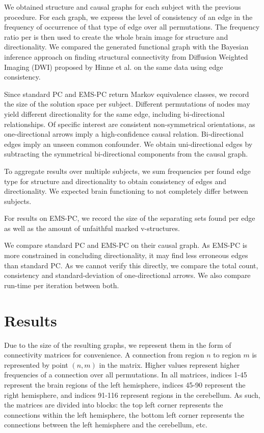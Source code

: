 \documentclass[a4paper, 10pt, english, onecolumn]{article}
\begin{document}
We obtained structure and causal graphs for each subject with the previous procedure.
For each graph, we express the level of consistency of an edge in the frequency of occurrence of that type of edge over all permutations.
The frequency ratio per is then used to create the whole brain image for structure and directionality.
We compared the generated functional graph with the Bayesian inference approach on finding structural connectivity from Diffusion Weighted Imaging (DWI) proposed by Hinne et al.\cite{hinne2013} on the same data using edge consistency.

Since standard PC and EMS-PC return Markov equivalence classes, we record the size of the solution space per subject.
Different permutations of nodes may yield different directionality for the same edge, including bi-directional relationships.
Of specific interest are consistent non-symmetrical orientations, as one-directional arrows imply a high-confidence causal relation.
Bi-directional edges imply an unseen common confounder.
We obtain uni-directional edges by subtracting the symmetrical bi-directional components from the causal graph.

To aggregate results over multiple subjects, we sum frequencies per found edge type for structure and directionality to obtain consistency of edges and directionality.
We expected brain functioning to not completely differ between subjects.

For results on EMS-PC, we record the size of the separating sets found per edge as well as the amount of unfaithful marked v-structures.

We compare standard PC and EMS-PC on their causal graph.
As EMS-PC is more constrained in concluding directionality, it may find less erroneous edges than standard PC.
As we cannot verify this directly, we compare the total count, consistency and standard-deviation of one-directional arrows.
We also compare run-time per iteration between both.

\section{Results}\label{sec:results}
Due to the size of the resulting graphs, we represent them in the form of connectivity matrices for convenience.
A connection from region $n$ to region $m$ is represented by point $(n,m)$ in the matrix.
Higher values represent higher frequencies of a connection over all permutations.
In all matrices, indices 1-45 represent the brain regions of the left hemisphere, indices 45-90 represent the right hemisphere, and indices 91-116 represent regions in the cerebellum.
As such, the matrices are divided into blocks: the top left corner represents the connections within the left hemisphere, the bottom left corner represents the connections between the left hemisphere and the cerebellum, etc.
\end{document}
